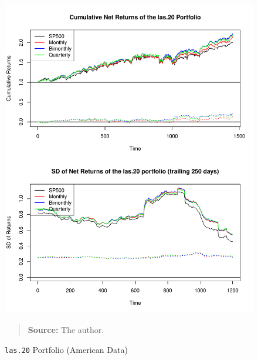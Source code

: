 \documentclass[preprint, doubleblind, authoryear,10pt]{elsarticle}
\begin{document}
\begin{figure}[htpb]
\centering
\footnotesize
\caption{\texttt{las.20} Portfolio (American Data)}
\label{fig:spy:las.20}
\includegraphics[width=.95\linewidth]{./figs/SP500-retac-las-20.pdf}
\begin{quote}
\textbf{Source:} The author.
\end{quote}
\end{figure}
\end{document}
